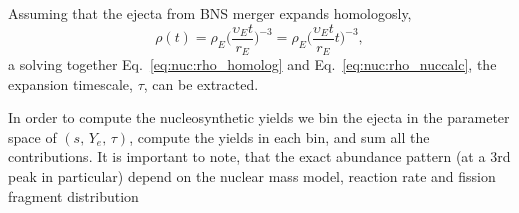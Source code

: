 Assuming that the ejecta from \ac{BNS} merger expands homologosly, 
%
\begin{equation}
\rho(t) = \rho_E\Big(\frac{\upsilon_E t}{r_E}\Big)^{-3} = 
\rho_E\Big(\frac{\upsilon_E t}{r_E}t\Big)^{-3},
\label{eq:nuc:rho_homolog}
\end{equation}
%
a solving together Eq.~\eqref{eq:nuc:rho_homolog} and Eq.~\eqref{eq:nuc:rho_nuccalc},
the expansion timescale, $\tau$, can be extracted.


In order to compute the nucleosynthetic yields we bin the ejecta in the 
parameter space of $(s, \, Y_e,\, \tau)$, compute the yields in each bin, and sum 
all the contributions.
%
It is important to note, that the exact \rproc{} abundance pattern (at a $3$rd peak in particular) 
depend on the nuclear mass model, reaction rate and fission fragment distribution 
\citep[\eg][]{Goriely:2004qb,Arcones:2010dz,Mumpower:2011ar,Mendoza-Temis:2014mja,Eichler:2014kma,Barnes:2020nfi}


